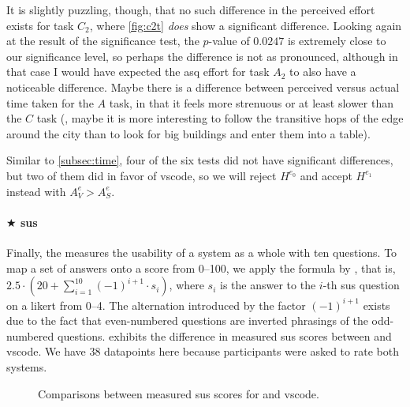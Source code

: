 \documentclass[../thesis]{subfiles}
\begin{document}
It is slightly puzzling, though, that no such difference in the perceived effort exists for task $C_2$, where \cref{fig:c2t} \emph{does} show a significant difference.
Looking again at the result of the significance test, the $p$-value of $0.0247$ is extremely close to our significance level, so perhaps the difference is not as pronounced, although in that case I would have expected the \gls{asq} effort for task $A_2$ to also have a noticeable difference.
Maybe there is a difference between perceived versus actual time taken for the $A$ task, in that it feels more strenuous or at least slower than the $C$ task (\eg, maybe it is more interesting to follow the transitive hops of the edge around the city than to look for big buildings and enter them into a table).

Similar to \cref{subsec:time}, four of the six tests did not have significant differences, but two of them did in favor of \gls{vscode}, so we will reject $H^{e_0}$ and accept $H^{e_1}$ instead with $A^e_V > A^e_S$.

\paragraph{$\bigstar$ \gls{sus}}
Finally, the  measures the usability of a system as a whole with ten questions.
To map a set of answers onto a score from 0--100, we apply the formula by \textcite{brooke1996}, that is, $2.5 \cdot (20 + \sum\limits_{i = 1}^{10} (-1)^{i+1} \cdot s_i)$, where $s_i$ is the answer to the $i$-th \gls{sus} question on a \gls{likert} from 0--4.
The alternation introduced by the factor $(-1)^{i+1}$ exists due to the fact that even-numbered questions are inverted phrasings of the odd-numbered questions.
 exhibits the difference in measured \gls{sus} scores between \SEE{} and \gls{vscode}.
We have 38 datapoints here because participants were asked to rate both systems.

\begin{figure}
	\center
	\violinsus
	\caption{Comparisons between measured \gls{sus} scores for \SEE{} and \gls{vscode}.}\label{fig:sus}
\end{figure}
\end{document}
